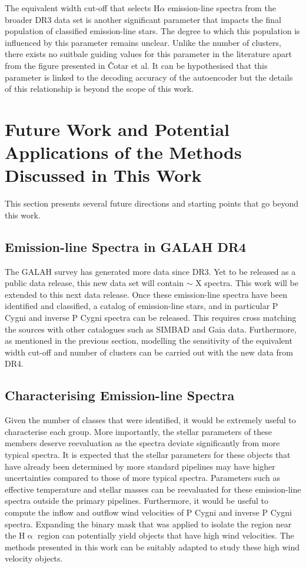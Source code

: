 The equivalent width cut-off that selects H$\alpha$ emission-line spectra from the broader DR3 data set is another significant parameter that impacts the final population of classified emission-line stars. The degree to which this population is influenced by this parameter remains unclear. Unlike the number of clusters, there exists no suitbale guiding values for this parameter in the literature apart from the figure presented in Čotar et al. It can be hypothesised that this parameter is linked to the decoding accuracy of the autoencoder but the details of this relationship is beyond the scope of this work.



\section{Future Work and Potential Applications of the Methods Discussed in This Work}

This section presents several future directions and starting points that go beyond this work. 

\subsection{Emission-line Spectra in GALAH DR4}

The GALAH survey has generated more data since DR3. Yet to be released as a public data release, this new data set will contain $\sim$ X spectra. This work will be extended to this next data release. Once these emission-line spectra have been identified and classified, a catalog of emission-line stars, and in particular P Cygni and inverse P Cygni spectra can be released. This requires cross matching the sources with other catalogues such as SIMBAD and Gaia data. Furthermore, as mentioned in the previous section, modelling the sensitivity of the equivalent width cut-off and number of clusters can be carried out with the new data from DR4.

\subsection{Characterising Emission-line Spectra}

Given the number of classes that were identified, it would be extremely useful to characterise each group. More importantly, the stellar parameters of these members deserve reevaluation as the spectra deviate significantly from more typical spectra. It is expected that the stellar parameters for these objects that have already been determined by more standard pipelines may have higher uncertainties compared to those of more typical spectra. Parameters such as effective temperature and stellar masses can be reevaluated for these emission-line spectra outside the primary pipelines. Furthermore, it would be useful to compute the inflow and outflow wind velocities of P Cygni and inverse P Cygni spectra. Expanding the binary mask that was applied to isolate the region near the H$\upalpha$ region can potentially yield objects that have high wind velocities. The methods presented in this work can be suitably adapted to study these high wind velocity objects.

